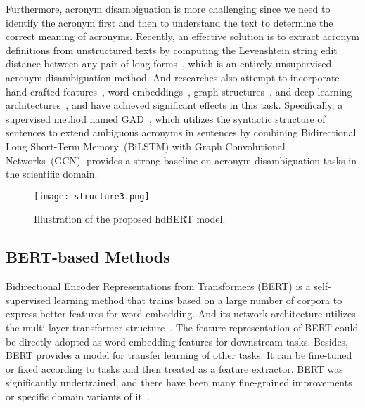 Furthermore, acronym disambiguation is more challenging since we need to identify the acronym first and then to understand the text to determine the correct meaning of acronyms.
Recently, an effective solution is to extract acronym definitions from unstructured texts by computing the Levenshtein string edit distance between any pair of long forms~\cite{ciosici2019unsupervised}, which is an entirely unsupervised acronym disambiguation method. And researches also attempt to incorporate hand crafted features~\cite{li2018guess}, word embeddings~\cite{charbonnier2018using,ciosici2019unsupervised}, graph structures~\cite{prokofyev2013ontology,veyseh-et-al-2020-what}, and deep learning architectures~\cite{jin2019deep,blevins2020moving}, and have achieved significant effects in this task.
Specifically, a supervised method named GAD~\cite{veyseh-et-al-2020-what}, which utilizes the syntactic structure of sentences to extend ambiguous acronyms in sentences by combining Bidirectional
Long Short-Term Memory~(BiLSTM) with Graph Convolutional Networks~(GCN), provides a strong baseline on acronym disambiguation tasks in the scientific domain.
\begin{figure*}
    \centering
    \texttt{[image: structure3.png]}
    \caption{Illustration of the proposed hdBERT model.}
    \label{fig:structure}
\end{figure*}
\subsection{BERT-based Methods}
Bidirectional Encoder Representations from Transformers (BERT) \cite{devlin2018bert} is a self-supervised learning method that trains based on a large number of corpora to express better features for word embedding. And its network architecture utilizes the multi-layer transformer structure~\cite{vaswani2017attention}.
The feature representation of BERT could be directly adopted as word embedding features for downstream tasks.
Besides, BERT provides a model for transfer learning of other tasks. It can be fine-tuned or fixed according to tasks and then treated as a feature extractor.
BERT was significantly undertrained, and there have been many fine-grained improvements or specific domain variants of it~\cite{Beltagy2019SciBERT,liu2019roberta,scarlini2020sensembert,lee2020biobert}.
